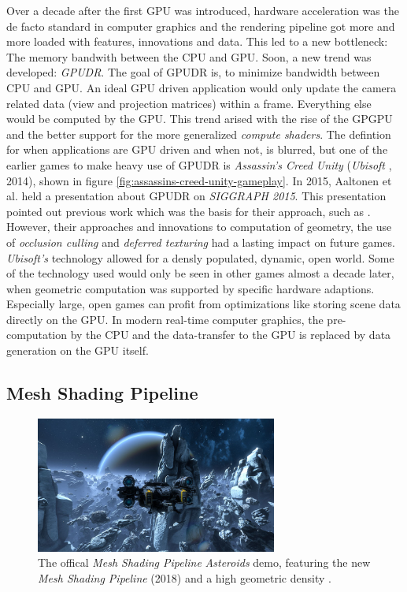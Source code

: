 Over a decade after the first \ac{GPU} was introduced, hardware acceleration was the de facto standard in 
computer graphics and the rendering pipeline got more and more loaded with features, innovations and data. 
This led to a new bottleneck: The memory bandwith between the \ac{CPU} and \ac{GPU}. Soon, a new trend was 
developed: \emph{\ac{GPUDR}}. The goal of \ac{GPUDR} is, to minimize bandwidth between \ac{CPU} and \ac{GPU}. 
An ideal \ac{GPU} driven application would only update the camera related data (view and projection matrices) 
within a frame. Everything else would be computed by the \ac{GPU}. This trend arised with the rise of the 
\ac{GPGPU} and the better support for the more generalized \emph{compute shaders}. The defintion for when 
applications are \ac{GPU} driven and when not, is blurred, but one of the earlier games to make heavy use of 
\ac{GPUDR} is \emph{Assassin's Creed Unity} (\emph{Ubisoft} \cite{Ubisoft2014}, 2014), shown in figure 
\ref{fig:assassins-creed-unity-gameplay}. In 2015, Aaltonen et al. \cite{Aaltonen2015} held a presentation 
about \ac{GPUDR} on \emph{SIGGRAPH 2015}. This presentation pointed out previous work which was the basis for 
their approach, such as \cite{Greene93, Greene95, Hill11}. However, their approaches and innovations to 
computation of geometry, the use of \emph{occlusion culling} and \emph{deferred texturing} had a lasting impact 
on future games. \emph{Ubisoft's} technology allowed for a densly populated, dynamic, open world. Some of the 
technology used would only be seen in other games almost a decade later, when geometric computation was 
supported by specific hardware adaptions. Especially large, open games can profit from optimizations like storing 
scene data directly on the \ac{GPU}. In modern real-time computer graphics, the pre-computation by the \ac{CPU} 
and the data-transfer to the \ac{GPU} is replaced by data generation on the \ac{GPU} itself.

\subsection*{Mesh Shading Pipeline} \label{subsec-mesh-shading-pipeline}


\begin{figure}[h]
    \centering
    \includegraphics[width=300px]{images/graphics/mesh-shading-asteroids-demo.jpg}
    \caption{The offical \emph{Mesh Shading Pipeline} \emph{Asteroids} demo, featuring the new \emph{Mesh Shading Pipeline} (2018)
    and a high geometric density \cite{Kraemer2018}.}
    \label{fig:mesh-shading-asteroids-demo}
\end{figure}

